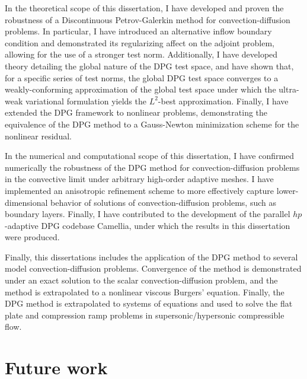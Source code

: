 In the theoretical scope of this dissertation, I have developed and proven the robustness of a Discontinuous Petrov-Galerkin method for convection-diffusion problems.  In particular, I have introduced an alternative inflow boundary condition and demonstrated its regularizing affect on the adjoint problem, allowing for the use of a stronger test norm.  Additionally, I have developed theory detailing the global nature of the DPG test space, and have shown that, for a specific series of test norms, the global DPG test space converges to a weakly-conforming approximation of the global test space under which the ultra-weak variational formulation yields the $L^2$-best approximation.  Finally, I have extended the DPG framework to nonlinear problems, demonstrating the equivalence of the DPG method to a Gauss-Newton minimization scheme for the nonlinear residual.  

In the numerical and computational scope of this dissertation, I have confirmed numerically the robustness of the DPG method for convection-diffusion problems in the convective limit under arbitrary high-order adaptive meshes.  I have implemented an anisotropic refinement scheme to more effectively capture lower-dimensional behavior of solutions of convection-diffusion problems, such as boundary layers.  Finally, I have contributed to the development of the parallel $hp$-adaptive DPG codebase Camellia\cite{Camellia}, under which the results in this dissertation were produced.  

Finally, this dissertations includes the application of the DPG method to several model convection-diffusion problems.  Convergence of the method is demonstrated under an exact solution to the scalar convection-diffusion problem, and the method is extrapolated to a nonlinear viscous Burgers' equation.  Finally, the DPG method is extrapolated to systems of equations and used to solve the flat plate and compression ramp problems in supersonic/hypersonic compressible flow.

\section{Future work}

